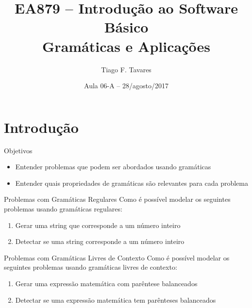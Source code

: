 \documentclass{beamer}
\title[06a-Gramáticas]{EA879 -- Introdução ao Software Básico\\Gramáticas e
Aplicações}
\author{Tiago F. Tavares}
\institute{FEEC -- UNICAMP}
\date{Aula 06-A -- 28/agosto/2017}
\begin{document}
\begin{frame}
  \titlepage
\end{frame}


\section{Introdução}

\begin{frame}{Objetivos}
  \Large
  \begin{itemize}
    \item Entender problemas que podem ser abordados usando gramáticas
    \item Entender quais propriedades de gramáticas são relevantes para cada
      problema
  \end{itemize}
\end{frame}

\begin{frame}{Problemas com Gramáticas Regulares}
  \large
  Como é possível modelar os seguintes problemas usando gramáticas regulares:
  \begin{enumerate}
    \item Gerar uma string que corresponde a um número inteiro
    \item Detectar se uma string corresponde a um número inteiro
  \end{enumerate}
\end{frame}

\begin{frame}{Problemas com Gramáticas Livres de Contexto}
  \large
  Como é possível modelar os seguintes problemas usando gramáticas livres de
  contexto:
  \begin{enumerate}
    \item Gerar uma expressão matemática com parêntese balanceados
    \item Detectar se uma expressão matemática tem parênteses balanceados
  \end{enumerate}
\end{frame}
\end{document}
